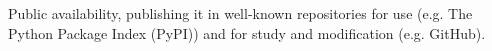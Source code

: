 \documentclass[preview]{standalone}
\begin{document}
Public availability, publishing it in well-known repositories for use (e.g. The Python Package Index (PyPI)) and for study and modification (e.g. GitHub).\\
\end{document}
